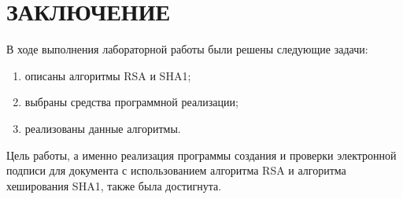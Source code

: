 \chapter*{ЗАКЛЮЧЕНИЕ}

В ходе выполнения лабораторной работы были решены следующие задачи:

\begin{enumerate}[label={\arabic*)}]
	\item описаны алгоритмы RSA и SHA1;
	\item выбраны средства программной реализации;
	\item реализованы данные алгоритмы.
\end{enumerate}

Цель работы, а именно реализация программы создания и проверки электронной подписи для документа с использованием алгоритма RSA и алгоритма хеширования SHA1, также была достигнута.
